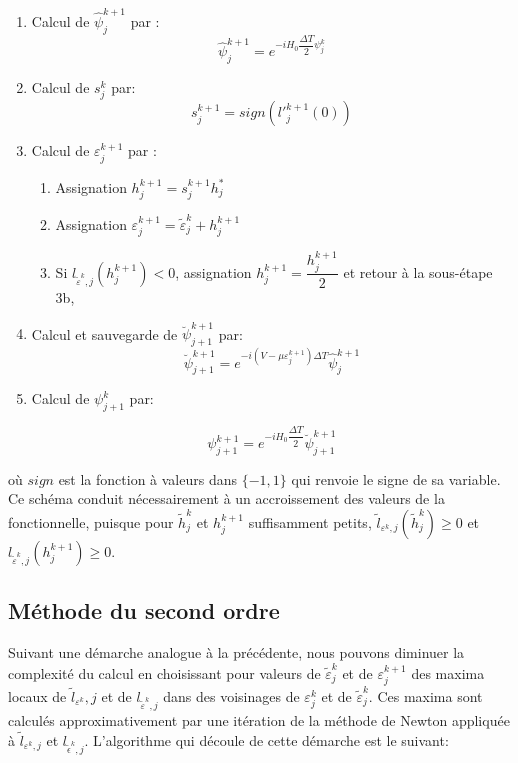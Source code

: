 \begin{itemize}
	\begin{enumerate}
		\item Calcul de $\widehat{\psi}_j^{k+1}$ par : $$ \widehat{\psi}_j^{k+1} = e^{-i H_0 \dfrac{\Delta T}{2} \psi_j^k} $$
		\item Calcul de $s_j^k$ par:
		$$s_j^{k+1} = sign({l'}_j^{k+1}(0))$$
	
	
	\item Calcul de $\varepsilon_j^{k+1}$ par :
	
		\begin{enumerate}
		\item Assignation $h_j^{k+1} = s_j^{k+1} h_j^*$
		\item Assignation $\varepsilon_j^{k+1} = \tilde{\varepsilon}_j^k + h_j^{k+1}$
		\item Si $l_{\tilde{\varepsilon}^k,j} (h_j^{k+1}) < 0$, assignation $h_j^{k+1} = \dfrac{h_j^{k+1}}{2}$ et retour à la sous-étape 3b,
		\end{enumerate}
	\item Calcul et sauvegarde de $\breve{\psi}_{j+1}^{k+1}$ par:
	$$\breve{\psi}_{j+1}^{k+1} = e^{-i(V- \mu \varepsilon_j^{k+1}) \Delta T} \widehat{\psi}_j^{k+1}$$
	
	\item Calcul de $\psi_{j+1}^k$ par: 
	
	$$\psi_{j+1}^{k+1} = e^{-i H_0 \dfrac{\Delta T}{2}} \breve{\psi}_{j+1}^{k+1}$$
	
\end{enumerate}
\end{itemize}

où $sign$ est la fonction à valeurs dans $\{-1,1\}$ qui renvoie le signe de sa variable. Ce schéma conduit nécessairement à un accroissement des valeurs de la fonctionnelle, puisque pour $\tilde{h}_j^k$ et $h_j^{k+1}$ suffisamment petits, $\tilde{l}_{\varepsilon^k,j}(\tilde{h}_j^k) \geq 0$ et $l_{\tilde{\varepsilon}^k,j}(h_j^{k+1})\geq0$.


\subsection{Méthode du second ordre}

Suivant une démarche analogue à la précédente, nous pouvons diminuer la complexité du calcul en choisissant pour valeurs de $\tilde{\varepsilon}_j^k$ et de $\varepsilon_j^{k+1}$ des maxima locaux de $\tilde{l}_{\varepsilon^k},j$ et de $l_{\tilde{\varepsilon}^k,j}$ dans des voisinages de $\varepsilon_j^k$ et de $\tilde{\varepsilon}_j^k$. Ces maxima sont calculés approximativement par une itération de la méthode de Newton appliquée à $\tilde{l}_{\varepsilon^k, j}$ et $l_{\tilde{\epsilon}^k,j}$. L'algorithme qui découle de cette démarche est le suivant:

